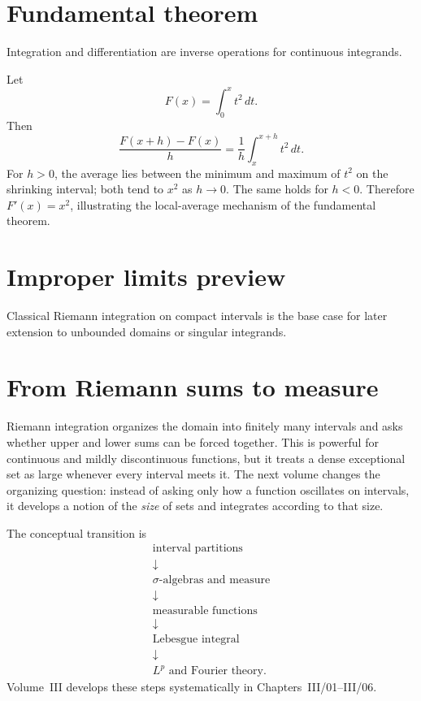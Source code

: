 \section{Fundamental theorem}
Integration and differentiation are inverse operations for continuous integrands.


\begin{example}\label{ex:ii10-expand-03}
Let
\[
F(x)=\int_0^x t^2\,dt.
\]
Then
\[
\frac{F(x+h)-F(x)}h
=\frac1h\int_x^{x+h}t^2\,dt.
\]
For \(h>0\), the average lies between the minimum and maximum of \(t^2\) on the
shrinking interval; both tend to \(x^2\) as \(h\to0\). The same holds for
\(h<0\). Therefore \(F'(x)=x^2\), illustrating the local-average mechanism of
the fundamental theorem.
\end{example}
\section{Improper limits preview}
Classical Riemann integration on compact intervals is the base case for later extension to unbounded domains or singular integrands.

\section{From Riemann sums to measure}
Riemann integration organizes the domain into finitely many intervals and asks whether upper and lower sums can be forced together. This is powerful for continuous and mildly discontinuous functions, but it treats a dense exceptional set as large whenever every interval meets it. The next volume changes the organizing question: instead of asking only how a function oscillates on intervals, it develops a notion of the \emph{size} of sets and integrates according to that size.

The conceptual transition is
\[
\boxed{
\begin{gathered}
\text{interval partitions}\\
\downarrow\\
\sigma\text{-algebras and measure}\\
\downarrow\\
\text{measurable functions}\\
\downarrow\\
\text{Lebesgue integral}\\
\downarrow\\
L^p\text{ and Fourier theory}.
\end{gathered}}
\]
Volume~III develops these steps systematically in Chapters~III/01--III/06.

